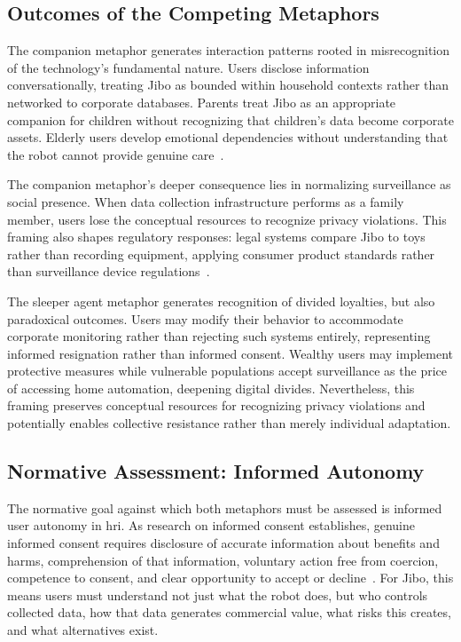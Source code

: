 \documentclass{ieee-portfolio}
\begin{document}
\subsection{Outcomes of the Competing Metaphors}

The companion metaphor generates interaction patterns rooted in misrecognition of the technology's fundamental nature. Users disclose information conversationally, treating Jibo as bounded within household contexts rather than networked to corporate databases. Parents treat Jibo as an appropriate companion for children without recognizing that children's data become corporate assets. Elderly users develop emotional dependencies without understanding that the robot cannot provide genuine care~\cite{darling_whos_2015}.

The companion metaphor's deeper consequence lies in normalizing surveillance as social presence. When data collection infrastructure performs as a family member, users lose the conceptual resources to recognize privacy violations. This framing also shapes regulatory responses: legal systems compare Jibo to toys rather than recording equipment, applying consumer product standards rather than surveillance device regulations~\cite{jones_hacking_2017}.

The sleeper agent metaphor generates recognition of divided loyalties, but also paradoxical outcomes. Users may modify their behavior to accommodate corporate monitoring rather than rejecting such systems entirely, representing informed resignation rather than informed consent. Wealthy users may implement protective measures while vulnerable populations accept surveillance as the price of accessing home automation, deepening digital divides. Nevertheless, this framing preserves conceptual resources for recognizing privacy violations and potentially enables collective resistance rather than merely individual adaptation.

\subsection{Normative Assessment: Informed Autonomy}

The normative goal against which both metaphors must be assessed is informed user autonomy in \gls{hri}. As research on informed consent establishes, genuine informed consent requires disclosure of accurate information about benefits and harms, comprehension of that information, voluntary action free from coercion, competence to consent, and clear opportunity to accept or decline~\cite{millett_cookies_2001}. For Jibo, this means users must understand not just what the robot does, but who controls collected data, how that data generates commercial value, what risks this creates, and what alternatives exist.
\end{document}
